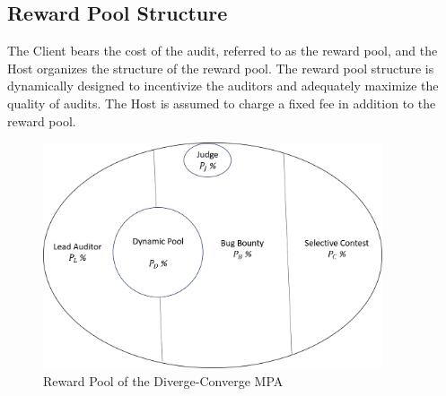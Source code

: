 \documentclass[10pt]{extarticle}
\begin{document}
\subsection{ Reward Pool Structure}\label{44-reward-pool-structure}

The Client bears the cost of the audit, referred to as the reward pool,
and the Host organizes the structure of the reward pool. The reward pool
structure is dynamically designed to incentivize the auditors and
adequately maximize the quality of audits. The Host is assumed to charge
a fixed fee in addition to the reward pool.

\begin{figure}[htp]
  \centering
  \includegraphics[width=10cm]{img/pool}
  \caption{Reward Pool of the Diverge-Converge MPA}
  \label{fig:galaxy}
\end{figure}
\end{document}
